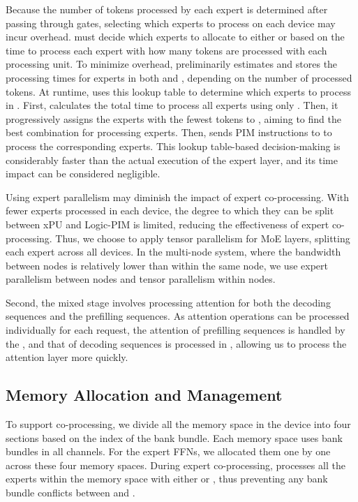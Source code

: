 Because the number of tokens processed by each expert is determined after passing through gates, selecting which experts to process on each device may incur overhead. 
\duplex must decide which experts to allocate to either \highp or \lowp based on the time to process each expert with how many tokens are processed with each processing unit.
To minimize overhead, \duplex preliminarily estimates and stores the processing times for experts in both \highp and \lowp, depending on the number of processed tokens. 
At runtime, \duplex uses this lookup table to determine which experts to process in \lowp. 
First, \duplex calculates the total time to process all experts using only \highp.
Then, it progressively assigns the experts with the fewest tokens to \lowp, aiming to find the best combination for processing experts.
Then, \highp sends PIM instructions to \lowp to process the corresponding experts.
This lookup table-based decision-making is considerably faster than the actual execution of the expert layer, and its time impact can be considered negligible.

Using expert parallelism may diminish the impact of expert co-processing. 
With fewer experts processed in each device, the degree to which they can be split between xPU and Logic-PIM is limited, reducing the effectiveness of expert co-processing. 
Thus, we choose to apply tensor parallelism for MoE layers, splitting each expert across all devices. 
In the multi-node system, where the bandwidth between nodes is relatively lower than within the same node, we use expert parallelism between nodes and tensor parallelism within nodes.



Second, the mixed stage involves processing attention for both the decoding sequences and the prefilling sequences. 
As attention operations can be processed individually for each request, the attention of prefilling sequences is handled by the \highp, and that of decoding sequences is processed in \lowp, allowing us to process the attention layer more quickly.



\subsection{Memory Allocation and Management}
\label{sec:duplex_memory_space_allocation}
To support co-processing, we divide all the memory space in the device into four sections based on the index of the bank bundle. 
Each memory space uses bank bundles in all channels.
For the expert FFNs, we allocated them one by one across these four memory spaces. 
During expert co-processing, \duplex processes all the experts within the memory space with either \lowp or \highp, thus preventing any bank bundle conflicts between \lowp and \highp.

